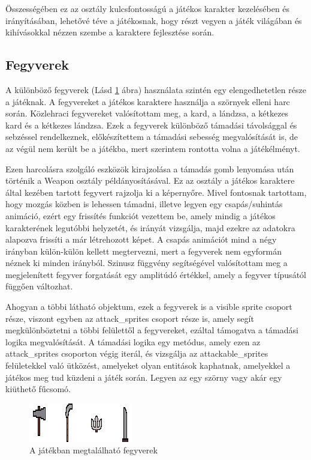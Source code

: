 Összességében ez az osztály kulcsfontosságú a játékos karakter kezelésében és irányításában, lehetővé téve a játékosnak, hogy részt vegyen a játék világában és kihívásokkal nézzen szembe a karaktere fejlesztése során.

\subsection{Fegyverek}

\indent \indent A különböző fegyverek (Lásd \ref{fig:A játékban megtalálható fegyverek} ábra) használata szintén egy elengedhetetlen része a játéknak. A fegyvereket a játékos karaktere használja a szörnyek elleni harc során. Közlehraci fegyvereket valósítottam meg, a kard, a lándzsa, a kétkezes kard és a kétkezes lándzsa. Ezek a fegyverek különböző támadási távolsággal és sebzéssel rendelkeznek, előkészítettem a támadási sebesség megvalósítását is, de az végül nem került be a játékba, mert szerintem rontotta volna a játékélményt.

Ezen harcolásra szolgáló eszközök kirajzolása a támadás gomb lenyomása után történik a Weapon osztály példányosításával. Ez az osztály a játékos karaktere által kezében tartott fegyvert rajzolja ki a képernyőre. Mivel fontosnak tartottam, hogy mozgás közben is lehessen támadni, illetve legyen egy csapás/suhintás animáció, ezért egy frissítés funkciót vezettem be, amely mindig a játékos karakterének legutóbbi helyzetét, és irányát vizsgálja, majd ezekre az adatokra alapozva frissíti a már létrehozott képet. A csapás animációt mind a négy irányban külön-külön kellett megtervezni, mert a fegyverek nem egyformán néznek ki minden irányból. Szinusz függvény segítségével valósítottam meg a megjelenített fegyver forgatását egy amplitúdó értékkel, amely a fegyver típusától függően változhat.

Ahogyan a többi látható objektum, ezek a fegyverek is a visible sprite csoport része, viszont egyben az attack\_sprites csoport része is, amely segít megkülönböztetni a többi felülettől a fegyvereket, ezáltal támogatva a támadási logika megvalósítását. A támadási logika egy metódus, amely ezen az attack\_sprites csoporton végig iterál, és vizsgálja az attackable\_sprites felületekkel való ütközést, amelyeket olyan entitások kaphatnak, amelyekkel a játékos meg tud küzdeni a játék során. Legyen az egy szörny vagy akár egy kiüthető fűcsomó. 

\begin{figure}[H]
    \centering
    \includegraphics[width=15.5truecm]{images/weapons.png}
    \caption{A játékban megtalálható fegyverek}
    \label{fig:A játékban megtalálható fegyverek}
\end{figure}


